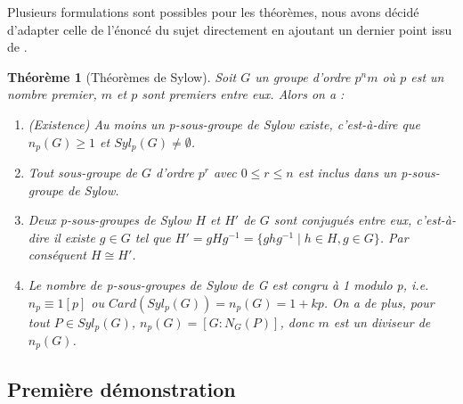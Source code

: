 \documentclass[french]{article}
\theoremstyle{definition}
\theoremstyle{plain}
\newtheorem{theorem}[subsubsection]{Théorème}
\theoremstyle{plain}
\theoremstyle{plain}
\theoremstyle{plain}
\theoremstyle{plain}
\begin{document}
Plusieurs formulations sont possibles pour les théorèmes, 
nous avons décidé d'adapter celle de l'énoncé du sujet directement en ajoutant un dernier point issu de \cite[p.~215]{chen2024napkin}.

\begin{theorem}[Théorèmes de Sylow]
	Soit \( G \) un groupe d'ordre \( p^{n}m \) où \( p \) est un nombre premier, \( m \) et \( p \) sont premiers entre eux. Alors on a :
	\begin{enumerate}[label={\upshape(\roman*)}]
		\item (Existence) Au moins un p-sous-groupe de Sylow existe, c'est-à-dire que \( n_{p}(G) \geq 1 \) et \( Syl_{p}(G) \neq \emptyset \).
		\item Tout sous-groupe de \( G \) d'ordre \( p^{r} \) avec \( 0 \leq r \leq n \) est inclus dans un p-sous-groupe de Sylow.
		\item Deux p-sous-groupes de Sylow \( H \) et \( H' \) de \( G \) sont conjugués entre eux, c'est-à-dire il existe \( g \in G \) tel que \( H' = gHg^{-1} = \{ ghg^{-1} \mid h \in H, g \in G \} \). Par conséquent \( H \cong H' \).
		\item Le nombre de p-sous-groupes de Sylow de G est congru à 1 modulo p, i.e. \( n_{p} \equiv 1 [p] \) ou \( Card(Syl_{p}({G})) = n_{p}(G) = 1 + kp \).
			On a de plus, pour tout \( P \in Syl_{p}({G}) \), \( n_{p}({G}) = [G : N_{G}({P}) ] \), donc \( m \) est un diviseur de \( n_p({G}) \).

	\end{enumerate}

\end{theorem}

\subsection{Première démonstration}
\end{document}
